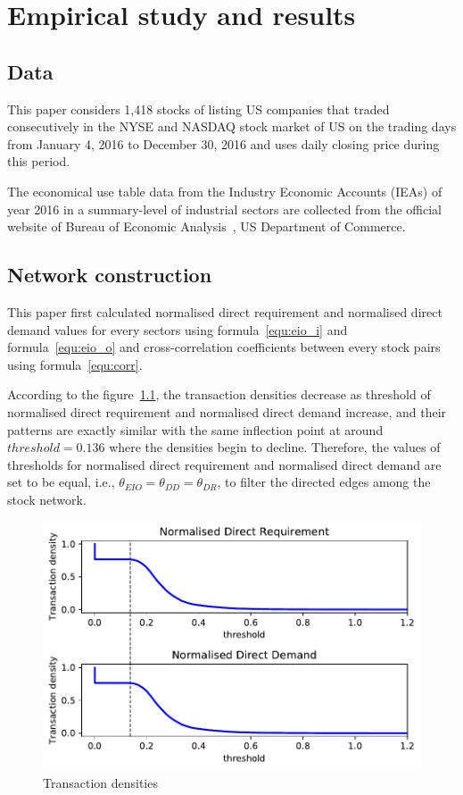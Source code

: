 \chapter[Short Chap title]{Empirical study and results}
\section{Data}
This paper considers 1,418 stocks of listing US companies that traded consecutively in the NYSE and NASDAQ stock market of US on the trading days from January 4, 2016 to December 30, 2016 and uses daily closing price during this period.

The economical use table data from the Industry Economic Accounts (IEAs) of year 2016 in a summary-level of industrial sectors are collected from the official website of Bureau of Economic Analysis~\cite{bea}, US Department of Commerce.


\section{Network construction}
This paper first calculated normalised direct requirement and normalised direct demand values for every sectors using formula~\ref{equ:eio_i} and formula~\ref{equ:eio_o} and cross-correlation coefficients between every stock pairs using formula~\ref{equ:corr}.

According to the figure~\ref{fig:eio_transaction_density}, the transaction densities decrease as threshold of normalised direct requirement and normalised direct demand increase, and their patterns are exactly similar with the same inflection point at around $threshold=0.136$ where the densities begin to decline. Therefore, the values of thresholds for normalised direct requirement and normalised direct demand are set to be equal, i.e., $\theta_{EIO}=\theta_{DD}=\theta_{DR}$,  to filter the directed edges among the stock network.

\begin{figure}
	\begin{center}
		\includegraphics[width=14cm]{eio_transaction_density}
	\end{center}
	\caption{Transaction densities}
	\label{fig:eio_transaction_density}
\end{figure}

